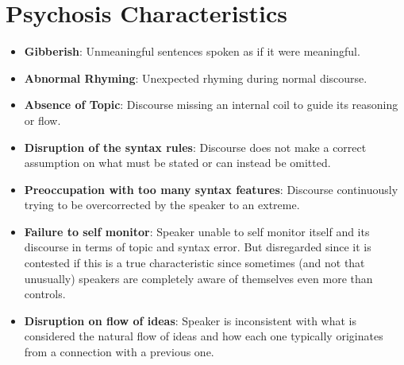 \documentclass{Paper_Summary}
\begin{document}
\section{Psychosis Characteristics}
    \begin{itemize}
        \item \textbf{Gibberish}: Unmeaningful sentences spoken as if it were meaningful.
        \item \textbf{Abnormal Rhyming}: Unexpected rhyming during normal discourse.
        \item \textbf{Absence of Topic}: Discourse missing an internal coil to guide its reasoning or flow.
        \item \textbf{Disruption of the syntax rules}: Discourse does not make a correct assumption on what must be stated or can instead be omitted.
        \item \textbf{Preoccupation with too many syntax features}: Discourse continuously trying to be overcorrected by the speaker to an extreme.
        \item \textbf{Failure to self monitor}: Speaker unable to self monitor itself and its discourse in terms of topic and syntax error. But disregarded since it is contested if this is a true characteristic since sometimes (and not that unusually) speakers are completely aware of themselves even more than controls.
        \item \textbf{Disruption on flow of ideas}: Speaker is inconsistent with what is considered the natural flow of ideas and how each one typically originates from a connection with a previous one.
    \end{itemize}
\end{document}
